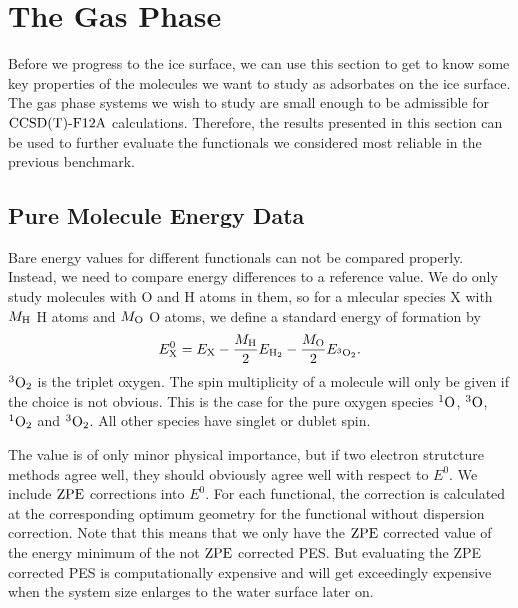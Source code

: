 \documentclass[8.5pt,twoside,twocolumn]{article}
\newcommand\zpe{\enmat{\te{ZPE}}}
\newcommand\singo{\enmat{{^1\te{O}}}}
\newcommand\tripo{\enmat{{^3\te{O}}}}
\newcommand\singot{\enmat{{^1\ot}}}
\newcommand\tripot{\enmat{{^3\ot}}}
\theoremstyle{standard}
\begin{document}
\section{The Gas Phase}
\label{Sec:Gas}

Before we progress to the ice surface, we can use this section
to get to know some key properties of the molecules we want to
study as adsorbates on the ice surface. The gas phase systems
we wish to study are small enough to be admissible for $\text{CCSD(T)-F12A}$
calculations. Therefore, the results presented in this section can
be used to further evaluate the functionals we considered most
reliable in the previous benchmark.

\subsection{Pure Molecule Energy Data}
\label{Sec:Gas:Energy}
Bare energy values for different functionals can not be compared
properly. Instead, we need to compare energy differences to
a reference value. We do only study molecules with O and H atoms
in them, so for a mlecular species X with $M_{\text{H}}$ H atoms and 
$M_{\text O}$ O atoms, we define a standard energy of formation
by
\begin{equation}
E^0_\X=E_\X - \frac {M_{\te H}} 2 E_{\htw} - \frac{M_{\te O}} 2 E_{\tripot}.
\label{Gas:FormationEnergy} 
\end{equation}
$\tripot$ is the triplet oxygen. The spin multiplicity of a molecule will
only be given if the choice is not obvious. This is the case for the
pure oxygen species $\singo$, $\tripo$, $\singot$ and $\tripot$. All other
species have singlet or dublet spin.

The value is of only minor physical importance, but if two electron
strutcture methods agree well, they should obviously agree well with respect to
$E^0$.
We include $\zpe$ corrections into $E^0$. For each functional, 
the correction is calculated at the corresponding optimum geometry
for the functional without dispersion correction. Note that this means
that we only have the $\zpe$ corrected value of the energy
minimum of the not $\zpe$ corrected PES. But evaluating the ZPE
corrected PES is computationally expensive and will get exceedingly expensive
when the system size enlarges to the water surface later on.
\end{document}
